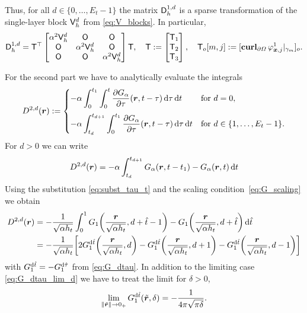 \documentclass[a4paper,11pt]{article}
\begin{document}
Thus, for all $d \in \{0,\ldots,E_t-1\}$ the matrix ${{\mathsf{D}}}_h^{1,d}$ is a sparse transformation of the single-layer block ${{\mathsf{V}}}^d_h$ from \eqref{eq:V_blocks}. In particular,
\begin{equation*}
  {\ensuremath{{\mathsf{D}}}}_h^{1,d} = {{\mathsf{T}}}^\top 
  \begin{bmatrix}
    \alpha^2{{\mathsf{V}}}^d_h & {{\mathsf{O}}} & {{\mathsf{O}}} \\
    {{\mathsf{O}}} & \alpha^2{{\mathsf{V}}}^d_h & {{\mathsf{O}}} \\
    {{\mathsf{O}}} & {{\mathsf{O}}} & \alpha^2{{\mathsf{V}}}^d_h
  \end{bmatrix}
  {\ensuremath{{\mathsf{T}}}},\quad
  {\ensuremath{{\mathsf{T}}}} :=
  \begin{bmatrix}
    {\ensuremath{{\mathsf{T}}}}_1 \\
    {{\mathsf{T}}}_2 \\
    {{\mathsf{T}}}_3
  \end{bmatrix},\quad
  {\ensuremath{{\mathsf{T}}}}_o[m,j] := [\operatorname{\mathbf{curl}}_{\partial\Omega} \varphi^1_{{{\bm{x}}},j}|_{\gamma_m}]_o.
\end{equation*}

For the second part we have to analytically evaluate the integrals
\begin{equation*}
  D^{2,d}({{\bm{r}}}) := 
  \begin{cases}
  \displaystyle
    -\alpha \int_{0}^{t_1} \int_{0}^{t} \frac{\partial G_\alpha}{\partial \tau}({{\bm{r}}},t-\tau) \,{\mathrm{d}}\tau \,{\mathrm{d}} t & \text{for } d = 0, \\[4mm]
  \displaystyle
    -\alpha \int_{t_d}^{t_{d+1}} \int_{0}^{t_1} \frac{\partial G_\alpha}{\partial \tau}({{\bm{r}}},t-\tau) \,{\mathrm{d}}\tau \,{\mathrm{d}} t & \text{for } d \in \{1,\ldots,E_t-1\}.
  \end{cases}
\end{equation*}
For $d>0$ we can write
\begin{equation*}
  D^{2,d}({{\bm{r}}}) = -\alpha \int_{t_d}^{t_{d+1}} G_\alpha({{\bm{r}}},t-t_1) - G_\alpha({{\bm{r}}},t) \,{\mathrm{d}} t
\end{equation*}
Using the substitution \eqref{eq:subst_tau_t} and the scaling condition~\eqref{eq:G_scaling} we obtain
\begin{align*}
  D^{2,d}({{\bm{r}}}) &= -\frac{1}{\sqrt{\alpha h_t}} \int_0^1 G_1\bigg(\frac{{{\bm{r}}}}{\sqrt{\alpha h_t}},d+\hat t-1\bigg) - G_1\bigg(\frac{{{\bm{r}}}}{\sqrt{\alpha h_t}},d + \hat t\bigg) \,{\mathrm{d}} \hat t \\
  &= -\frac{1}{\sqrt{\alpha h_t}} \bigg[ 2 G_1^{{\mathrm{d}}\hat t}\bigg( \frac{{{\bm{r}}}}{\sqrt{\alpha h_t}}, d \bigg) - G_1^{{\mathrm{d}}\hat t}\bigg( \frac{{{\bm{r}}}}{\sqrt{\alpha h_t}}, d + 1 \bigg) - G_1^{{\mathrm{d}}\hat t}\bigg( \frac{{{\bm{r}}}}{\sqrt{\alpha h_t}}, d - 1 \bigg) \bigg]
\end{align*}
with $G_1^{{\mathrm{d}}\hat t} = -G_1^{{\mathrm{d}}\hat \tau}$ from \eqref{eq:G_dtau}. In addition to the limiting case \eqref{eq:G_dtau_lim_d} we have to treat the limit for $\delta>0$,
\begin{equation*}
  \lim_{\|\tilde {{{\bm{r}}}}\| \to 0_+} G^{{\mathrm{d}}\hat t}_1(\tilde {{{\bm{r}}}},\delta) = -\frac{1}{4\pi\sqrt{\pi\delta}}.
\end{equation*}
\end{document}
